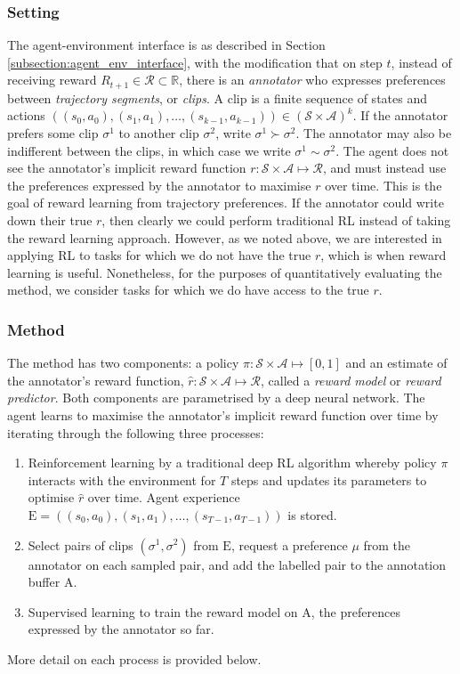 \documentclass[11pt, a4paper, bibliography=totoc]{report}
\newcommand{\reals}{\mathbb{R}}
\newcommand{\rp}{\hat{r}}
\newcommand{\expbuff}{\mathrm{E}}
\newcommand{\annbuff}{\mathrm{A}}
\begin{document}
\subsubsection{Setting}
The agent-environment interface is as described in Section \ref{subsection:agent_env_interface}, with the modification that on step $ t $, instead of receiving reward $ R_{t+1} \in \mathcal{R} \subset \reals $, there is an \textit{annotator} who expresses preferences between \textit{trajectory segments}, or \textit{clips}. A clip is a finite sequence of states and actions $ ((s_0,a_0), (s_1,a_1),\dots,(s_{k-1},a_{k-1})) \in (\mathcal{S} \times \mathcal{A})^k $. If the annotator prefers some clip $ \sigma^1 $ to another clip $ \sigma^2 $, write $ \sigma^1 \succ \sigma^2 $. The annotator may also be indifferent between the clips, in which case we write $ \sigma^1 \sim \sigma^2 $. The agent does not see the annotator's implicit reward function $ r : \mathcal{S} \times \mathcal{A} \mapsto \mathcal{R} $, and must instead use the preferences expressed by the annotator to maximise $ r $ over time. This is the goal of reward learning from trajectory preferences.
If the annotator could write down their true $ r $, then clearly we could perform traditional RL instead of taking the reward learning approach. However, as we noted above, we are interested in applying RL to tasks for which we do not have the true $ r $, which is when reward learning is useful. Nonetheless, for the purposes of quantitatively evaluating the method, we consider tasks for which we do have access to the true $ r $.

\subsubsection{Method}
The method has two components: a policy $ \pi : \mathcal{S} \times \mathcal{A} \mapsto [0,1] $ and an estimate of the annotator's reward function, $ \rp : \mathcal{S} \times \mathcal{A} \mapsto \mathcal{R} $, called a \textit{reward model} or \textit{reward predictor}. Both components are parametrised by a deep neural network. The agent learns to maximise the annotator's implicit reward function over time by iterating through the following three processes:
\begin{enumerate}
	\item Reinforcement learning by a traditional deep RL algorithm whereby policy $ \pi $ interacts with the environment for $ T $ steps and updates its parameters to optimise $ \rp $ over time. Agent experience $ \expbuff = ((s_0, a_0), (s_1, a_1),\dots, (s_{T-1}, a_{T-1}) ) $ is stored.
	\item Select pairs of clips $ (\sigma^1, \sigma^2) $ from $ \expbuff $, request a preference $ \mu $ from the annotator on each sampled pair, and add the labelled pair to the annotation buffer $ \annbuff $.
	\item Supervised learning to train the reward model on $ \annbuff $, the preferences expressed by the annotator so far.
\end{enumerate}
More detail on each process is provided below.
\end{document}
